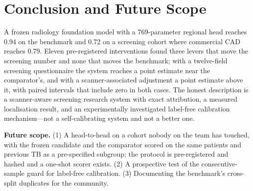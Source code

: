 \documentclass[12pt,a4paper]{report}
\begin{document}
\chapter{Conclusion and Future Scope}
A frozen radiology foundation model with a 769-parameter regional head reaches 0.94 on the benchmark and 0.72 on a screening cohort where commercial CAD reaches 0.79. Eleven pre-registered interventions found three levers that move the screening number and none that moves the benchmark; with a twelve-field screening questionnaire the system reaches a point estimate near the comparator's, and with a scanner-associated adjustment a point estimate above it, with paired intervals that include zero in both cases. The honest description is a scanner-aware screening research system with exact attribution, a measured localisation result, and an experimentally investigated label-free calibration mechanism---not a self-calibrating system and not a better one.

\textbf{Future scope.} (1) A head-to-head on a cohort nobody on the team has touched, with the frozen candidate and the comparator scored on the same patients and previous TB as a pre-specified subgroup; the protocol is pre-registered and hashed and a one-shot scorer exists. (2) A prospective test of the consecutive-sample guard for label-free calibration. (3) Documenting the benchmark's cross-split duplicates for the community.
\end{document}
